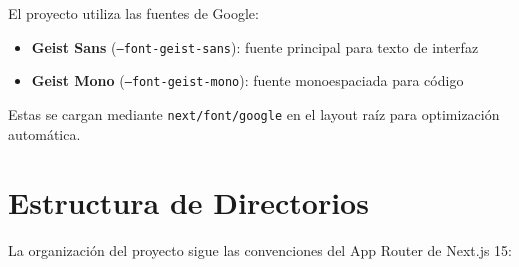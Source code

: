 \documentclass[12pt,a4paper]{article}
\begin{document}
El proyecto utiliza las fuentes de Google:
\begin{itemize}
  \item \textbf{Geist Sans} (\texttt{--font-geist-sans}): fuente principal para texto de interfaz
  \item \textbf{Geist Mono} (\texttt{--font-geist-mono}): fuente monoespaciada para código
\end{itemize}

Estas se cargan mediante \texttt{next/font/google} en el layout raíz para optimización automática.

\section{Estructura de Directorios}

La organización del proyecto sigue las convenciones del App Router de Next.js 15:
\end{document}
